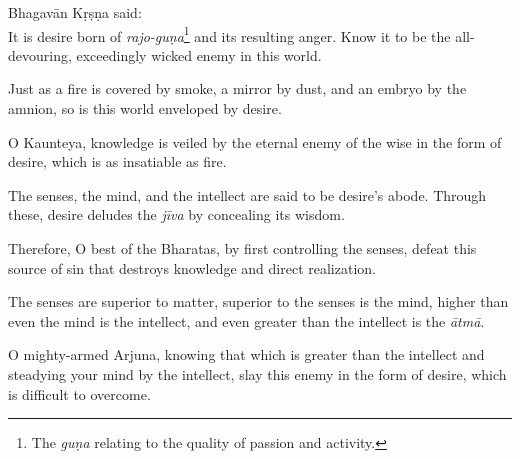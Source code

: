 {\hspace*{1em}Bhagavān Kṛṣṇa said: \\
It is desire born of \textit{rajo-guṇa}\footnote{The \textit{guṇa} relating to the quality of passion and activity.} and its resulting anger. Know it to be the all-devouring, exceedingly wicked enemy in this world.} 

{Just as a fire is covered by smoke, a mirror by dust, and an embryo by the amnion, so is this world enveloped by desire.}

{O Kaunteya, knowledge is veiled by the eternal enemy of the wise in the form of desire, which is as insatiable as fire.}

{The senses, the mind, and the intellect are said to be desire’s abode. Through these, desire deludes the \textit{jīva} by concealing its wisdom.}

{Therefore, O best of the Bharatas, by first controlling the senses, defeat this source of sin that destroys knowledge and direct realization.}

{The senses are superior to matter, superior to the senses is the mind, higher than even the mind is the intellect, and even greater than the intellect is the \textit{ātmā}.}

{O mighty-armed Arjuna, knowing that which is greater than the intellect and steadying your mind by the intellect, slay this enemy in the form of desire, which is difficult to overcome.}

